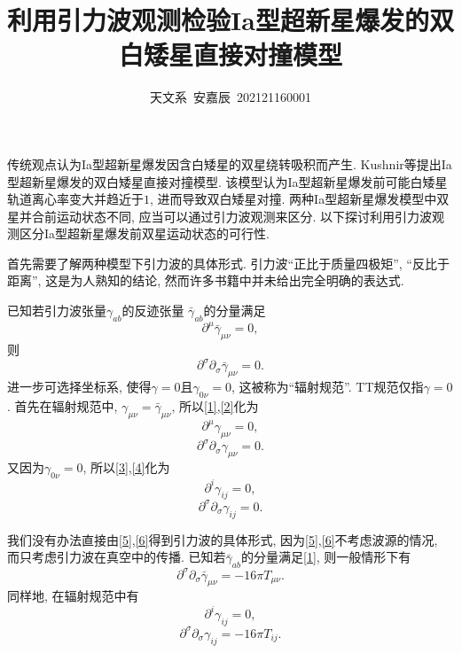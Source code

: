 \documentclass[12pt]{ctexart}
\title{利用引力波观测检验Ia型超新星爆发的双白矮星直接对撞模型}
\author{天文系\ 安嘉辰\ 202121160001}
\def\p{\partial}
\begin{document}
\maketitle

传统观点认为Ia型超新星爆发因含白矮星的双星绕转吸积而产生\cite{Carroll2007}. Kushnir等\cite{Kushnir2013}提出Ia型超新星爆发的双白矮星直接对撞模型. 该模型认为Ia型超新星爆发前可能白矮星轨道离心率变大并趋近于$1$, 进而导致双白矮星对撞. 两种Ia型超新星爆发模型中双星并合前运动状态不同, 应当可以通过引力波观测来区分. 以下探讨利用引力波观测区分Ia型超新星爆发前双星运动状态的可行性.

首先需要了解两种模型下引力波的具体形式. 引力波``正比于质量四极矩'', ``反比于距离'', 这是为人熟知的结论, 然而许多书籍中并未给出完全明确的表达式\cite{Misner1973,Sathyaprakash2009,Wang2020}.

已知若引力波张量$\gamma_{ab}$的反迹张量\cite{Wang2020} $\bar{\gamma}_{ab}$的分量满足
\begin{equation}
    \p^{\mu}\bar{\gamma}_{\mu\nu}=0,\label{1}
\end{equation}
则\cite{Wald1984}
\begin{equation}
    \p^{\sigma}\p_{\sigma}\bar{\gamma}_{\mu\nu}=0.\label{2}
\end{equation}
进一步可选择坐标系, 使得$\gamma=0$且$\gamma_{0\nu}=0$, 这被称为``辐射规范''. TT规范仅指$\gamma=0$ \cite{Wang2020}. 首先在辐射规范中, $\gamma_{\mu\nu}=\bar{\gamma}_{\mu\nu}$, 所以\eqref{1},\eqref{2}化为
\begin{equation}
    \p^{\mu}{\gamma}_{\mu\nu}=0,\label{3}
\end{equation}
\begin{equation}
    \p^{\sigma}\p_{\sigma}{\gamma}_{\mu\nu}=0.\label{4}
\end{equation}
又因为$\gamma_{0\nu}=0$, 所以\eqref{3},\eqref{4}化为
\begin{equation}
    \p^{i}{\gamma}_{ij}=0,\label{5}
\end{equation}
\begin{equation}
    \p^{\sigma}\p_{\sigma}{\gamma}_{ij}=0.\label{6}
\end{equation}

我们没有办法直接由\eqref{5},\eqref{6}得到引力波的具体形式, 因为\eqref{5},\eqref{6}不考虑波源的情况, 而只考虑引力波在真空中的传播. 已知若$\bar{\gamma}_{ab}$的分量满足\eqref{1}, 则一般情形下有
\begin{equation}
    \p^{\sigma}\p_{\sigma}\bar{\gamma}_{\mu\nu}=-16\pi T_{\mu\nu}.\label{7}
\end{equation}
同样地, 在辐射规范中有
\begin{equation}
    \p^{i}{\gamma}_{ij}=0,\label{8}
\end{equation}
\begin{equation}
    \p^{\sigma}\p_{\sigma}{\gamma}_{ij}=-16\pi T_{ij}.\label{9}
\end{equation}
\end{document}
